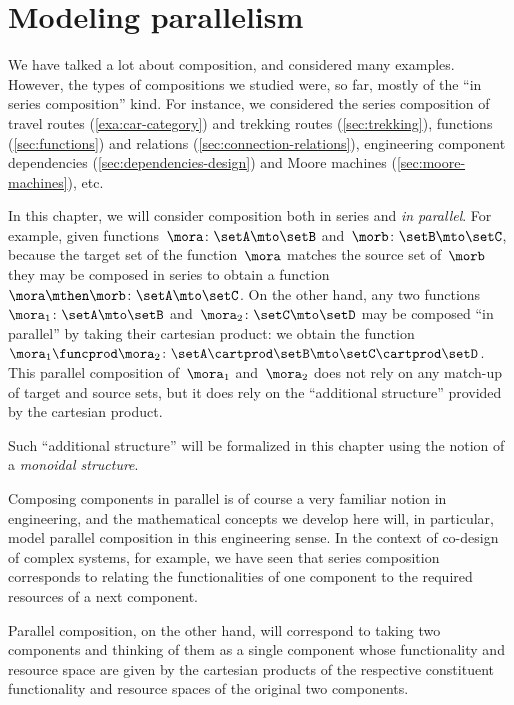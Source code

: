 
\section{Modeling parallelism}
\label{sec:modeling-parallelism}

We have talked a lot about composition, and considered many examples.
However, the types of compositions we studied were, so far, mostly of the ``in series composition'' kind.
For instance, we considered the series composition of travel routes (\cref{exa:car-category}) and trekking routes (\cref{sec:trekking}), functions (\cref{sec:functions}) and relations (\cref{sec:connection-relations}), engineering component dependencies (\cref{sec:dependencies-design}) and Moore machines (\cref{sec:moore-machines}), etc.

In this chapter, we will consider composition both in series and \emph{in parallel}.
For example, given functions~$\mora\colon \setA \mto \setB$ and~$\morb\colon \setB \mto \setC$, because the target set of the function~$\mora$ matches the source set of~$\morb$ they may be composed in series to obtain a function~$\mora \mthen \morb\colon \setA \mto \setC$.
On the other hand, any two functions~$\mora_1 \colon \setA \mto \setB$ and~$\mora_2 \colon \setC \mto \setD$ may be composed ``in parallel'' by taking their cartesian product: we obtain the function~$\mora_1 \funcprod \mora_2\colon \setA \cartprod \setB \mto \setC \cartprod \setD$.
This parallel composition of~$\mora_1$ and~$\mora_2$ does not rely on any match-up of target and source sets, but it does rely on the ``additional structure'' provided by the cartesian product.

Such ``additional structure'' will be formalized in this chapter using the notion of a \emph{monoidal structure}.

Composing components in parallel is of course a very familiar notion in engineering, and the mathematical concepts we develop here will, in particular, model parallel composition in this engineering sense.
In the context of co-design of complex systems, for example, we have seen that series composition corresponds to relating the functionalities of one component to the required resources of a next component.


Parallel composition, on the other hand, will correspond to taking two components and thinking of them as a single component whose functionality and resource space are given by the cartesian products of the respective constituent functionality and resource spaces of the original two components.

